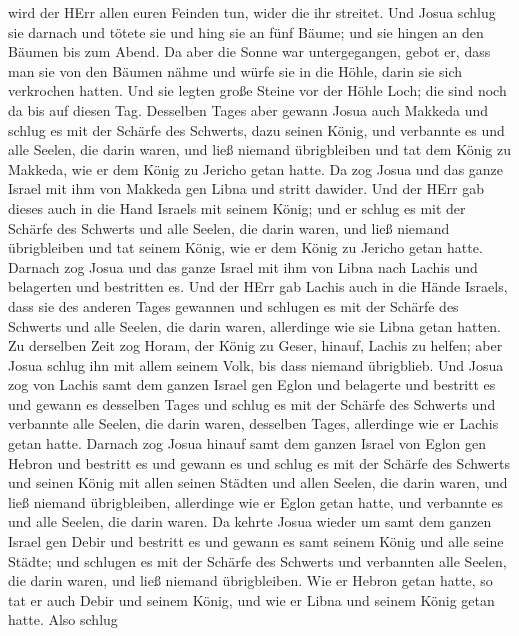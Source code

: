 wird der HErr allen euren Feinden tun, wider die ihr streitet.
 Und Josua schlug sie darnach und tötete sie und hing sie
an fünf Bäume; und sie hingen an den Bäumen bis zum Abend. 
Da aber die Sonne war untergegangen, gebot er, dass man sie von den
Bäumen nähme und würfe sie in die Höhle, darin sie sich verkrochen
hatten. Und sie legten große Steine vor der Höhle Loch; die sind noch da
bis auf diesen Tag.  Desselben Tages aber gewann Josua auch
Makkeda und schlug es mit der Schärfe des Schwerts, dazu seinen König,
und verbannte es und alle Seelen, die darin waren, und ließ niemand
übrigbleiben und tat dem König zu Makkeda, wie er dem König zu Jericho
getan hatte.  Da zog Josua und das ganze Israel mit ihm von
Makkeda gen Libna und stritt dawider.  Und der HErr gab
dieses auch in die Hand Israels mit seinem König; und er schlug es mit
der Schärfe des Schwerts und alle Seelen, die darin waren, und ließ
niemand übrigbleiben und tat seinem König, wie er dem König zu Jericho
getan hatte.  Darnach zog Josua und das ganze Israel mit
ihm von Libna nach Lachis und belagerten und bestritten es.
 Und der HErr gab Lachis auch in die Hände Israels, dass
sie des anderen Tages gewannen und schlugen es mit der Schärfe des
Schwerts und alle Seelen, die darin waren, allerdinge wie sie Libna
getan hatten.  Zu derselben Zeit zog Horam, der König zu
Geser, hinauf, Lachis zu helfen; aber Josua schlug ihn mit allem seinem
Volk, bis dass niemand übrigblieb.  Und Josua zog von
Lachis samt dem ganzen Israel gen Eglon und belagerte und bestritt es
 und gewann es desselben Tages und schlug es mit der
Schärfe des Schwerts und verbannte alle Seelen, die darin waren,
desselben Tages, allerdinge wie er Lachis getan hatte. 
Darnach zog Josua hinauf samt dem ganzen Israel von Eglon gen Hebron und
bestritt es  und gewann es und schlug es mit der Schärfe
des Schwerts und seinen König mit allen seinen Städten und allen Seelen,
die darin waren, und ließ niemand übrigbleiben, allerdinge wie er Eglon
getan hatte, und verbannte es und alle Seelen, die darin waren.
 Da kehrte Josua wieder um samt dem ganzen Israel gen Debir
und bestritt es  und gewann es samt seinem König und alle
seine Städte; und schlugen es mit der Schärfe des Schwerts und
verbannten alle Seelen, die darin waren, und ließ niemand übrigbleiben.
Wie er Hebron getan hatte, so tat er auch Debir und seinem König, und
wie er Libna und seinem König getan hatte.  Also schlug
